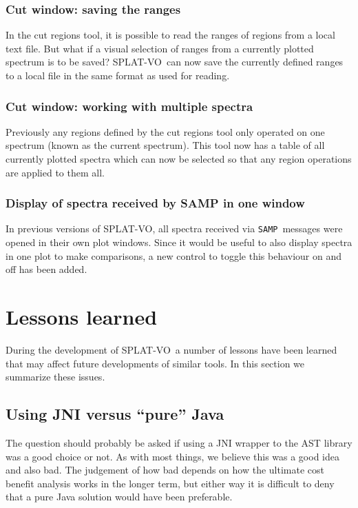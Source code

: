 \documentclass[final,authoryear,5p,times,twocolumn]{elsarticle}
\newcommand{\samp}{\texttt{SAMP}}
\newcommand{\splatvo}{{\textsf{\small{SPLAT-VO}}}}
\begin{document}
\subsubsection{Cut window: saving the ranges}

In the cut regions tool, it is possible to read the ranges of regions from a
local text file. But what if a visual selection of ranges from a currently
plotted spectrum is to be saved?  \splatvo\ can now save the currently
defined ranges to a local file in the same format as used for reading.

\subsubsection{Cut window: working with multiple spectra}

Previously any regions defined by the cut regions tool only operated on one
spectrum (known as the current spectrum). This tool now has a table of all
currently plotted spectra which can now be selected so that any region
operations are applied to them all.

\subsubsection{Display of spectra received by SAMP in one window}

In previous versions of \splatvo, all spectra received via \samp\ messages were
opened in their own plot windows. Since it would be useful to also display
spectra in one plot to make comparisons, a new control to toggle this behaviour
on and off has been added.

\section{Lessons learned}

During the development of \splatvo\ a number of lessons have been learned that
may affect future developments of similar tools. In this section we summarize
these issues.

\subsection{Using JNI versus ``pure'' Java}
\label{sec:jniast-lesson}

The question should probably be asked if using a JNI wrapper to the AST library
was a good choice or not. As with most things, we believe this was a good idea
and also bad. The judgement of how bad depends on how the ultimate cost benefit
analysis works in the longer term, but either way it is difficult to deny that
a pure Java solution would have been preferable.
\end{document}
